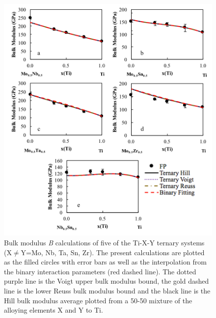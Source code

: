 \pagebreak
\begin{figure}[H]
	\centering
	\includegraphics[width=\textwidth]{Chapter-6/Figures/tixybulk1.png}
	\caption{Bulk modulus \textit{B} calculations of five of the Ti-X-Y ternary systems (X$\neq$Y=Mo, Nb, Ta, Sn, Zr). The present calculations are plotted as the filled circles with error bars as well as the interpolation from the binary interaction parameters (red dashed line). The dotted purple line is the Voigt upper bulk modulus bound, the gold dashed line is the lower Reuss bulk modulus bound and the black line is the Hill bulk modulus average plotted from a 50-50 mixture of the alloying elements X and Y to Ti.}
	\label{Ch6-figure:tixybulk1}
\end{figure}

